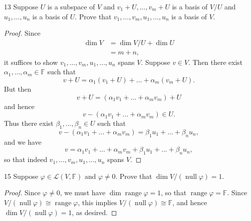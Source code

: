 \documentclass{extarticle}
\newenvironment{problem}[1]{\begin{prob*}{#1}{}}{\end{prob*}}
\newcommand{\F}{\mathbb{F}}
\newcommand{\Hom}{\mathcal{L}}
\DeclareMathOperator{\Null}{null}
\DeclareMathOperator{\Range}{range}
\begin{document}
\begin{problem}{13}
Suppose $U$ is a subspace of $V$ and $v_1+U,\dots,v_m+U$ is a basis of $V/U$ and $u_1,\dots,u_n$ is a basis of $U$.  Prove that $v_1,\dots,v_m,u_1,\dots,u_n$ is a basis of $V$.
\end{problem}
\begin{proof}
Since 
\begin{align*}
\dim V &= \dim V/U + \dim U\\
&= m + n,
\end{align*}
it suffices to show $v_1,\dots, v_m,u_1,\dots,u_n$ spans $V$.  Suppose $v\in V$.  Then there exist $\alpha_1,\dots,\alpha_m\in\F$ such that
\begin{equation*}
v + U = \alpha_1(v_1 + U) + \dots + \alpha_m(v_m + U).
\end{equation*}
But then
\begin{equation*}
v + U = \left(\alpha_1v_1 + \dots + \alpha_mv_m\right) + U
\end{equation*}
and hence 
\begin{equation*}
v - \left(\alpha_1v_1 + \dots + \alpha_mv_m\right) \in U.
\end{equation*}
Thus there exist $\beta_1,\dots, \beta_n\in U$ such that
\begin{equation*}
v - \left(\alpha_1v_1 + \dots + \alpha_mv_m\right) = \beta_1u_1 + \dots + \beta_nu_n,
\end{equation*}
and we have
\begin{equation*}
v = \alpha_1v_1 + \dots + \alpha_mv_m +  \beta_1u_1 + \dots + \beta_nu_n,
\end{equation*}
so that indeed $v_1,\dots,v_m,u_1,\dots,u_n$ spans $V$.
\end{proof}

\begin{problem}{15}
Suppose $\varphi\in\Hom(V,\F)$ and $\varphi\neq 0$.  Prove that $\dim V/(\Null\varphi) = 1$.
\end{problem}
\begin{proof}
Since $\varphi\neq 0$, we must have $\dim\Range\varphi = 1$, so that $\Range\varphi = \F$.  Since $V/(\Null\varphi)\cong \Range\varphi$, this implies $V/(\Null\varphi)\cong\F$, and hence $\dim V/(\Null\varphi) = 1$, as desired.
\end{proof}
\end{document}
